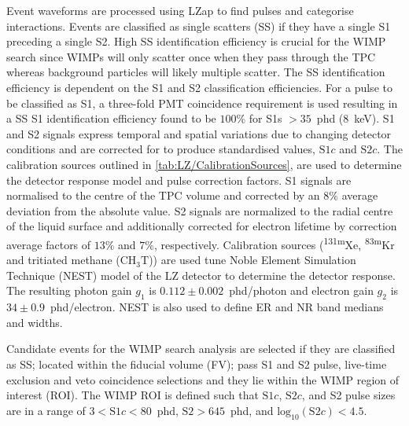 Event waveforms are processed using LZap to find pulses and categorise interactions. Events are classified as single scatters (SS) if they have a single S1 preceding a single S2. High SS identification efficiency is crucial for the WIMP search since WIMPs will only scatter once when they pass through the TPC whereas background particles will likely multiple scatter. The SS identification efficiency is dependent on the S1 and S2 classification efficiencies. For a pulse to be classified as S1, a three-fold PMT coincidence requirement is used resulting in a SS S1 identification efficiency found to be $100\%$ for S1s $>35$~phd (8~keV). S1 and S2 signals express temporal and spatial variations due to changing detector conditions and are corrected for to produce standardised values, $\text{S1}c$ and $\text{S2}c$. The calibration sources outlined in \autoref{tab:LZ/CalibrationSources}, are used to determine the detector response model and pulse correction factors. S1 signals are normalised to the centre of the TPC volume and corrected by an $8\%$ average deviation from the absolute value. S2 signals are normalized to the radial centre of the liquid surface and additionally corrected for electron lifetime by correction average factors of $13\%$ and $7\%$, respectively.
Calibration sources (\textsuperscript{131m}Xe, \textsuperscript{83m}Kr and tritiated methane ($\text{CH}_3\text{T}$)) are used tune Noble Element Simulation Technique (NEST) \cite{NEST2011} model of the LZ detector to determine the detector response. The resulting photon gain $g_1$ is $0.112\pm0.002$~phd/photon and electron gain $g_2$ is $34\pm0.9$~phd/electron. NEST is also used to define ER and NR band medians and widths.

Candidate events for the WIMP search analysis are selected if they are classified as SS; located within the fiducial volume (FV); pass S1 and S2 pulse, live-time exclusion and veto coincidence selections and they lie within the WIMP region of interest (ROI). The WIMP ROI is defined such that $\text{S1}c$, $\text{S2}c$, and S2 pulse sizes are in a range of $3<\text{S1}c<80$~phd, $\text{S2}>645$~phd, and $\text{log}_\text{10}(\text{S2}c)<4.5$. 

